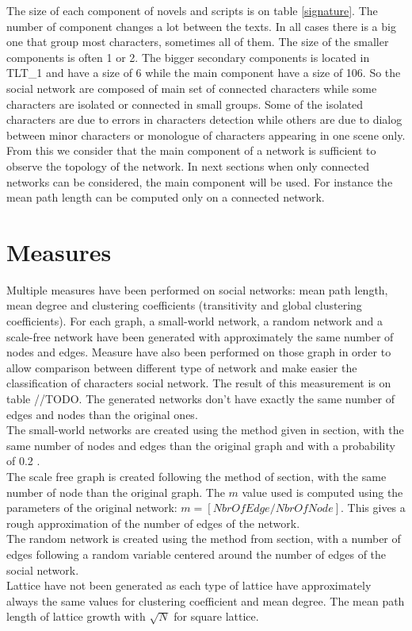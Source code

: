 \documentclass[a4paper, 12pt]{report}
\begin{document}
The size of each component of novels and scripts is on table \ref{signature}. The number of component changes a lot between the texts. In all cases there is a big one that group most characters, sometimes all of them. The size of the smaller components is often 1 or 2. The bigger secondary components is located in TLT\_1 and have a size of 6 while the main component have a size of 106. So the social network are composed of main set of connected characters while some characters are isolated or connected in small groups. Some of the isolated characters are due to errors in characters detection while others are due to dialog between minor characters or monologue of characters appearing in one scene only. From this we consider that the main component of a network is sufficient to observe the topology of the network. In next sections when only connected networks can be considered, the main component will be used. For instance the mean path length can be computed only on a connected network.


\section{Measures}
Multiple measures have been performed on social networks: mean path length, mean degree and clustering coefficients (transitivity and global clustering coefficients). For each graph, a small-world network, a random network and a scale-free network have been generated with approximately the same number of nodes and edges. Measure have also been performed on those graph in order to allow comparison between different type of network and make easier the classification of characters social network. The result of this measurement is on table //TODO. The generated networks don't have exactly the same number of edges and nodes than the original ones.\\

The small-world networks are created using the method given in section, with the same number of nodes and edges than the original graph and with a probability of 0.2 .\\
The scale free graph is created following the method of section, with the same number of node than the original graph. The $m$ value used is computed using the parameters of the original network: $m = [NbrOfEdge / NbrOfNode]$. This gives a rough approximation of the number of edges of the network.\\
The random network is created using the method from section, with a number of edges following a random variable centered around the number of edges of the social network.\\
Lattice have not been generated as each type of lattice have approximately always the same values for clustering coefficient and mean degree. The mean path length of lattice growth with $\sqrt{N}$ for square lattice.\\
\end{document}
